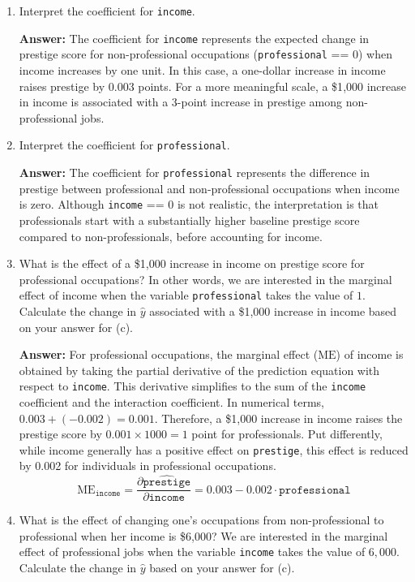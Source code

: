 \documentclass[12pt,letterpaper]{article}
\begin{document}
\begin{enumerate}
	\item [(d)]
	Interpret the coefficient for \texttt{income}.
	
	\textbf{Answer:}  
	The coefficient for \texttt{income} represents the expected change in prestige score for non-professional occupations (\texttt{professional} == 0) when income increases by one unit. In this case, a one-dollar increase in income raises prestige by 0.003 points. For a more meaningful scale, a \$1{,}000 increase in income is associated with a 3-point increase in prestige among non-professional jobs.
	
	\item [(e)]
	Interpret the coefficient for \texttt{professional}.
	
	\textbf{Answer:}  
	The coefficient for \texttt{professional} represents the difference in prestige between professional and non-professional occupations when income is zero. Although \texttt{income} == 0 is not realistic, the interpretation is that professionals start with a substantially higher baseline prestige score compared to non-professionals, before accounting for income.

	\item [(f)]
	What is the effect of a \$1,000 increase in income on prestige score for professional occupations? In other words, we are interested in the marginal effect of income when the variable \texttt{professional} takes the value of $1$. Calculate the change in $\hat{y}$ associated with a \$1,000 increase in income based on your answer for (c).
	
	\textbf{Answer:} 
	For professional occupations, the marginal effect ($\text{ME}$) of income is obtained by taking the partial derivative of the prediction equation with respect to \texttt{income}. This derivative simplifies to the sum of the \texttt{income} coefficient and the interaction coefficient. In numerical terms, $0.003 + (-0.002) = 0.001$. Therefore, a \$1{,}000 increase in income raises the prestige score by $0.001 \times 1000 = 1$ point for professionals. Put differently, while income generally has a positive effect on \texttt{prestige}, this effect is reduced by 0.002 for individuals in professional occupations.
	\[
	\text{ME}_{\texttt{income}} = \frac{\partial \widehat{\texttt{prestige}}}{\partial \texttt{income}} = 0.003 - 0.002 \cdot \texttt{professional}
	\]
	\newpage
	
	\item [(g)]
	What is the effect of changing one's occupations from non-professional to professional when her income is \$6,000? We are interested in the marginal effect of professional jobs when the variable \texttt{income} takes the value of $6,000$. Calculate the change in $\hat{y}$ based on your answer for (c).
	

\end{enumerate}
\end{document}
